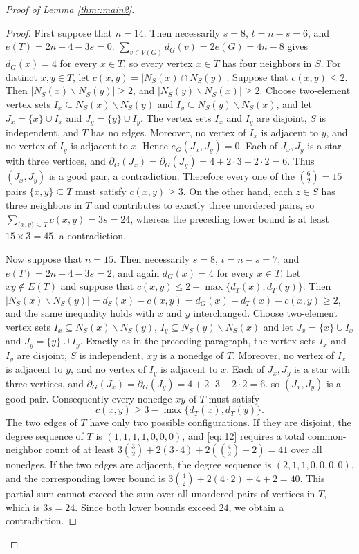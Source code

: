 \documentclass[11pt]{article}
\theoremstyle{definition}
\begin{document}
\begin{proof}[Proof of Lemma \ref{thm::main2}]
\begin{proof}
    First suppose that $n=14$. Then necessarily $s=8$, $t=n-s=6$, and $e(T)=2n-4-3s=0$. $\sum_{v\in V(G)}d_G(v)=2e(G)=4n-8$ gives $d_G(x)=4$ for every $x\in T$, so every vertex $x\in T$ has four neighbors in $S$. For distinct $x,y\in T$, let $c(x,y)=|N_S(x)\cap N_S(y)|$.
    Suppose that $c(x,y)\leq 2$. Then $|N_S(x)\backslash N_S(y)|\geq2$, and $|N_S(y)\backslash N_S(x)|\geq 2$.
    Choose two-element vertex sets $I_x\subseteq N_S(x)\backslash N_S(y)$ and $I_y\subseteq N_S(y)\backslash N_S(x)$,
    and let $J_x=\{x\}\cup I_x$ and $J_y=\{y\}\cup I_y$. The vertex sets $I_x$ and $I_y$ are disjoint, $S$ is independent, and $T$ has no edges. Moreover, no vertex of $I_x$ is adjacent to $y$, and no vertex of $I_y$ is adjacent to $x$. Hence $e_G(J_x,J_y)=0$. Each of $J_x,J_y$ is a star with three vertices, and $\partial_G(J_x)=\partial_G(J_y)=4+2\cdot3-2\cdot2=6$.
    Thus $(J_x,J_y)$ is a good pair, a contradiction. Therefore every one of the $\binom{6}{2}=15$ pairs $\{x,y\}\subseteq T$ must satisfy $c(x,y)\geq 3$. On the other hand, each $z\in S$ has three neighbors in $T$ and contributes to exactly three unordered pairs, so $\sum_{\{x,y\}\subseteq T}c(x,y)=3s=24$, whereas the preceding lower bound is at least $15\times 3=45$, a contradiction.


    Now suppose that $n=15$. Then necessarily $s=8$, $t=n-s=7$, and $e(T)=2n-4-3s=2$, and again $d_G(x)=4$ for every $x\in T$. Let $xy\notin E(T)$ and suppose that $c(x,y)\leq 2-\max\{d_T(x),d_T(y)\}$. Then $|N_S(x)\backslash N_S(y)|=d_S(x)-c(x,y)=d_G(x)-d_T(x)-c(x,y)\geq 2$, and the same inequality holds with $x$ and $y$ interchanged. Choose two-element vertex sets $I_x\subseteq N_S(x)\backslash N_S(y)$, $I_y\subseteq N_S(y)\backslash N_S(x)$ and let $J_x=\{x\}\cup I_x$ and $J_y=\{y\}\cup I_y$. Exactly as in the preceding paragraph, the vertex sets $I_x$ and $I_y$ are disjoint, $S$ is independent, $xy$ is a nonedge of $T$. Moreover, no vertex of $I_x$ is adjacent to $y$, and no vertex of $I_y$ is adjacent to $x$. Each of $J_x,J_y$ is a star with three vertices, and $\partial_G(J_x)=\partial_G(J_y)=4+2\cdot3-2\cdot2=6$. so $(J_x,J_y)$ is a good pair. Consequently every nonedge $xy$ of $T$ must satisfy
    \begin{equation}\label{eq::12}
      c(x,y)\geq 3-\max\{d_T(x),d_T(y)\}.
    \end{equation}
    The two edges of $T$ have only two possible configurations. If they are disjoint, the degree sequence of $T$ is $(1,1,1,1,0,0,0)$, and \eqref{eq::12} requires a total common-neighbor count of at least $3\binom{3}{2}+2(3\cdot4)+2\left(\binom{4}{2}-2\right)=41$
    over all nonedges. If the two edges are adjacent, the degree sequence is $(2,1,1,0,0,0,0)$, and the corresponding lower bound is $3\binom{4}{2}+2(4\cdot2)+4+2=40$.
    This partial sum cannot exceed the sum over all unordered pairs of vertices in $T$, which is $3s=24$. Since both lower bounds exceed $24$, we obtain a contradiction.


\end{proof}
\end{proof}
\end{document}
